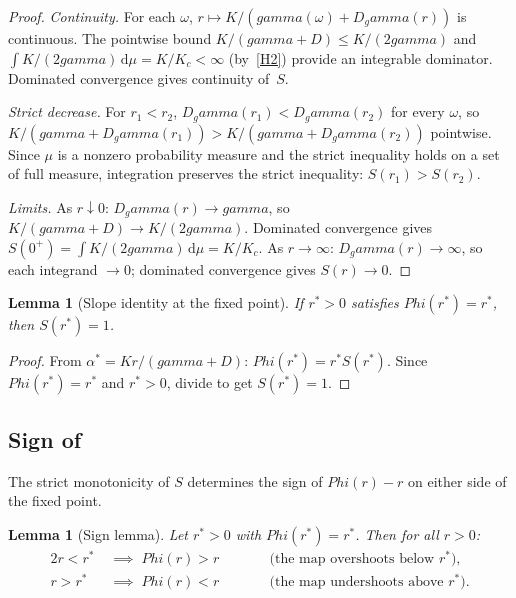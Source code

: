 \documentclass[11pt,a4paper]{article}
\makeatletter
\let\Phi\relax\def\Phi{Phi}%
\let\gamma\relax\def\gamma{gamma}%
\let\texorpdfstring\@secondoftwo}
\newtheorem{lemma}[theorem]{Lemma}
\theoremstyle{definition}
\makeatother
\begin{document}
\begin{proof}
\emph{Continuity.} For each $\omega$, $r\mapsto K/(\gamma(\omega)+D_\gamma(r))$ is continuous. The pointwise bound $K/(\gamma+D) \leq K/(2\gamma)$ and $\int K/(2\gamma)\,\mathrm{d}\mu = K/K_c < \infty$ (by~\ref{H2}) provide an integrable dominator. Dominated convergence gives continuity of~$S$.

\emph{Strict decrease.} For $r_1 < r_2$, $D_\gamma(r_1) < D_\gamma(r_2)$ for every $\omega$, so $K/(\gamma+D_\gamma(r_1)) > K/(\gamma+D_\gamma(r_2))$ pointwise. Since $\mu$ is a nonzero probability measure and the strict inequality holds on a set of full measure, integration preserves the strict inequality: $S(r_1) > S(r_2)$.

\emph{Limits.} As $r\downarrow 0$: $D_\gamma(r)\to\gamma$, so $K/(\gamma+D)\to K/(2\gamma)$. Dominated convergence gives $S(0^+) = \int K/(2\gamma)\,\mathrm{d}\mu = K/K_c$. As $r\to\infty$: $D_\gamma(r)\to\infty$, so each integrand $\to 0$; dominated convergence gives $S(r)\to 0$.
\end{proof}

\begin{lemma}[Slope identity at the fixed point]\label{lem:slope-one}
If $r^* > 0$ satisfies $\Phi(r^*) = r^*$, then $S(r^*) = 1$.
\end{lemma}

\begin{proof}
From $\alpha^* = Kr/(\gamma + D)$: $\Phi(r^*) = r^* S(r^*)$. Since $\Phi(r^*) = r^*$ and $r^* > 0$, divide to get $S(r^*) = 1$.
\end{proof}

\subsection{Sign of \texorpdfstring{$\Phi(r) - r$}{Phi(r) - r}}

The strict monotonicity of $S$ determines the sign of $\Phi(r) - r$ on either side of the fixed point.

\begin{lemma}[Sign lemma]\label{lem:sign}
Let $r^* > 0$ with $\Phi(r^*) = r^*$. Then for all $r > 0$:
\begin{alignat}{2}
r < r^* &\;\implies\; \Phi(r) > r &\qquad &\text{(the map overshoots below $r^*$),} \label{eq:sign-below}\\
r > r^* &\;\implies\; \Phi(r) < r &\qquad &\text{(the map undershoots above $r^*$).} \label{eq:sign-above}
\end{alignat}
\end{lemma}
\end{document}
